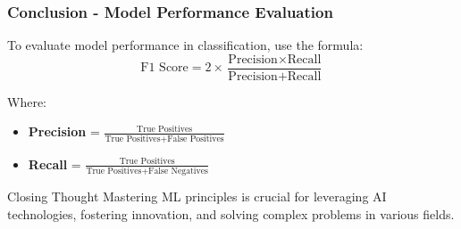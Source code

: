 \documentclass[aspectratio=169]{beamer}
\begin{document}
\begin{frame}[fragile]
    \frametitle{Conclusion - Model Performance Evaluation}
    To evaluate model performance in classification, use the formula:
    \begin{equation}
        \text{F1 Score} = 2 \times \frac{\text{Precision} \times \text{Recall}}{\text{Precision} + \text{Recall}}
    \end{equation}
    
    Where:
    \begin{itemize}
        \item \textbf{Precision} = \( \frac{\text{True Positives}}{\text{True Positives} + \text{False Positives}} \)
        \item \textbf{Recall} = \( \frac{\text{True Positives}}{\text{True Positives} + \text{False Negatives}} \)
    \end{itemize}
    
    \begin{block}{Closing Thought}
        Mastering ML principles is crucial for leveraging AI technologies, fostering innovation, and solving complex problems in various fields.
    \end{block}
\end{frame}
\end{document}
